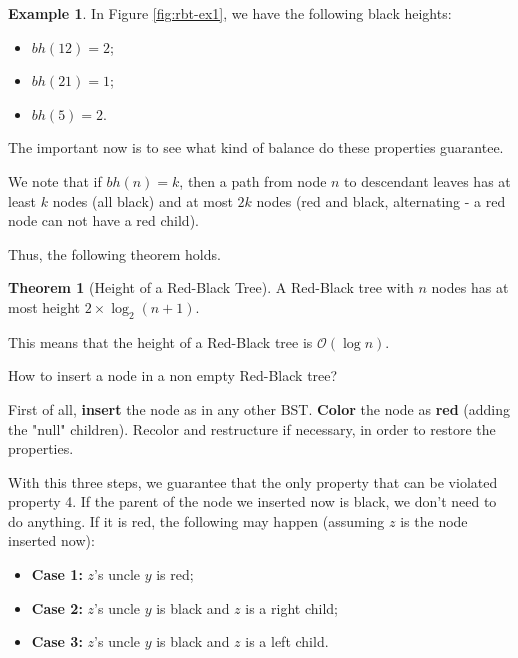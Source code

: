 \documentclass[12pt,a4paper,oneside]{article}
\theoremstyle{definition}
\newtheorem{exmp}{Example}[section]
\newtheorem{theorem}{Theorem}[section]
\begin{document}
\begin{exmp}
In Figure \ref{fig:rbt-ex1}, we have the following black heights:

\begin{itemize}
	\item $bh \left( 12 \right) = 2$;
	\item $bh \left( 21 \right) = 1$;
	\item $bh \left( 5 \right) = 2$.
\end{itemize}
\end{exmp}

The important now is to see what kind of balance do these properties guarantee.

We note that if $bh \left( n \right) = k$, then a path from node $n$ to descendant leaves has at least $k$ nodes (all black) and at most $2k$ nodes (red and black, alternating - a red node can not have a red child).

Thus, the following theorem holds.

\begin{theorem}[Height of a Red-Black Tree]\label{th:rb-height}
	A Red-Black tree with $n$ nodes has at most height $2 \times \log _{2} \left( n + 1 \right)$.
	
	This means that the height of a Red-Black tree is $\mathcal{O} \left( \log n \right)$. \\
\end{theorem}

How to insert a node in a non empty Red-Black tree?

First of all, \textbf{insert} the node as in any other BST. \textbf{Color} the node as \textbf{red} (adding the "null" children). Recolor and restructure if necessary, in order to restore the properties.

With this three steps, we guarantee that the only property that can be violated property 4. If the parent of the node we inserted now is black, we don't need to do anything. If it is red, the following may happen (assuming $z$ is the node inserted now):

\begin{itemize}
	\item \textbf{Case 1:} $z$'s uncle $y$ is red;
	\item \textbf{Case 2:} $z$'s uncle $y$ is black and $z$ is a right child;
	\item \textbf{Case 3:} $z$'s uncle $y$ is black and $z$ is a left child.
\end{itemize}
\end{document}
